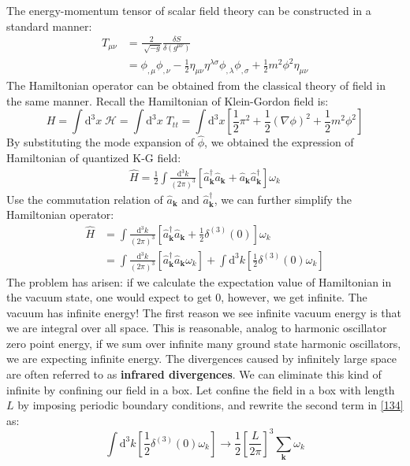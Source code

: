 \documentclass[12pt]{article}
\numberwithin{equation}{section}
\theoremstyle{1style}
\newcommand{\tbf}[1]{\textbf{#1}}
\newcommand{\id}{\mathrm{d}}
\begin{document}
The energy-momentum tensor of scalar field theory can be constructed in a standard manner:
\begin{align}
  T_{\mu\nu} & =\frac{2}{\sqrt[]{-g}}\frac{\delta S}{\delta(g^{\mu\nu})}                                         \\
             & =\phi_{,\mu}\phi_{,\nu}-\frac{1}{2}\eta_{\mu\nu}\eta^{\lambda\sigma}\phi_{,\lambda}\phi_{,\sigma}
  +\frac{1}{2}m^2\phi^2\eta_{\mu\nu}
\end{align}
The Hamiltonian operator can be obtained from the classical theory of field in the same manner.
Recall the Hamiltonian of Klein-Gordon field is:
\begin{equation}
  H=\int\id^3x\;\mathcal{H}=\int\id^3x\;T_{tt}=\int\id^3x\left[\frac{1}{2}\pi^2+\frac{1}{2}(\nabla\phi)^2+\frac{1}{2}m^2\phi^2\right]
\end{equation}
By substituting the mode expansion of \(\hat{\phi}\), we obtained the expression of Hamiltonian of quantized K-G field:
\begin{align}
  \hat{H}=\frac{1}{2}\int \frac{\id^{3}k}{(2\pi)^3}\left[\hat{a}^{\dagger}_{\mathbf{k}}\hat{a}_{\mathbf{k}}+\hat{a}_{\mathbf{k}}\hat{a}^{\dagger}_{\mathbf{k}}\right]\omega_{k}
\end{align}
Use the commutation relation of \(\hat{a}_{\mathbf{k}}\) and \(\hat{a}^{\dagger}_{\mathbf{k}}\), we can further simplify the Hamiltonian operator:
\begin{align}\label{134}
  \hat{H} & =\int \frac{\id^{3}k}{(2\pi)^3}\left[\hat{a}^{\dagger}_{\mathbf{k}}\hat{a}_{\mathbf{k}}+\frac{1}{2}\delta^{(3)}(0)\right]\omega_{k} \\
          & =\int \frac{\id^{3}k}{(2\pi)^3}\left[\hat{a}^{\dagger}_{\mathbf{k}}\hat{a}_{\mathbf{k}}\omega_{k}\right]+
  \int \id^{3}k\left[\frac{1}{2}\delta^{(3)}(0)\omega_{k}\right]
\end{align}
The problem has arisen: if we calculate the expectation value of Hamiltonian in the vacuum state, one would expect to get 0,
however, we get infinite.
The vacuum has infinite energy!
The first reason we see infinite vacuum energy is that we are integral over all space. This is reasonable, analog
to harmonic oscillator zero point energy,
if we sum over infinite many ground state harmonic oscillators, we are expecting infinite energy.
The divergences caused by infinitely large space are often referred to as \tbf{infrared divergences}.
We can eliminate this kind of infinite by confining our field in a box.
Let confine the field in a box with length \(L\) by imposing periodic boundary conditions, and rewrite the second term in \ref{134} as:
\begin{equation}\label{135}
  \int \id^{3}k\left[\frac{1}{2}\delta^{(3)}(0)\omega_{k}\right]\rightarrow\frac{1}{2}\left[\frac{L}{2\pi}\right]^{3}\sum_{\mathbf{k}}\omega_{k}
\end{equation}
\end{document}
